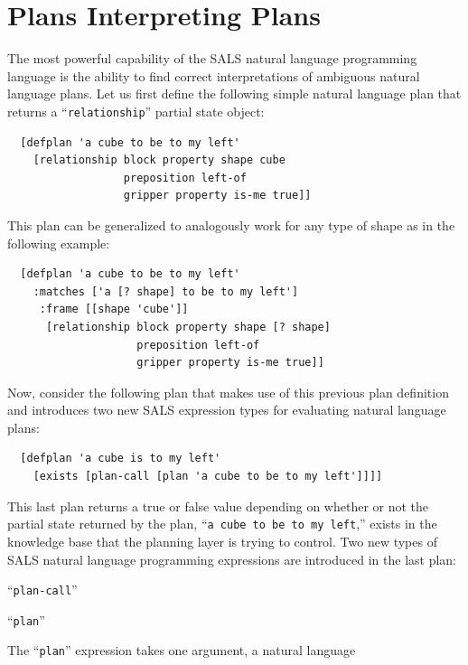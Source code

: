 \section{Plans Interpreting Plans}
\label{section:plans_interpreting_plans}

The most powerful capability of the SALS natural language programming
language is the ability to find correct interpretations of ambiguous
natural language plans.  Let us first define the following simple
natural language plan that returns a ``{\tt{relationship}}'' partial
state object:
\begin{samepage}
\begin{Verbatim}
  [defplan 'a cube to be to my left'
    [relationship block property shape cube
                  preposition left-of
                  gripper property is-me true]]
\end{Verbatim}
\end{samepage}
This plan can be generalized to analogously work for any type of shape
as in the following example:
\begin{samepage}
\begin{Verbatim}
  [defplan 'a cube to be to my left'
    :matches ['a [? shape] to be to my left']
     :frame [[shape 'cube']]
      [relationship block property shape [? shape]
                    preposition left-of
                    gripper property is-me true]]
\end{Verbatim}
\end{samepage}
Now, consider the following plan that makes use of this previous plan
definition and introduces two new SALS expression types for evaluating
natural language plans:
\begin{samepage}
\begin{Verbatim}
  [defplan 'a cube is to my left'
    [exists [plan-call [plan 'a cube to be to my left']]]]
\end{Verbatim}
\end{samepage}
This last plan returns a true or false value depending on whether or
not the partial state returned by the plan, ``{\tt{a cube to be to my
    left}},'' exists in the knowledge base that the planning layer is
trying to control.  Two new types of SALS natural language programming
expressions are introduced in the last plan:
\begin{packed_enumerate}
\item{``{\tt{plan-call}}''}
\item{``{\tt{plan}}''}
\end{packed_enumerate}
The ``{\tt{plan}}'' expression takes one argument, a natural language
